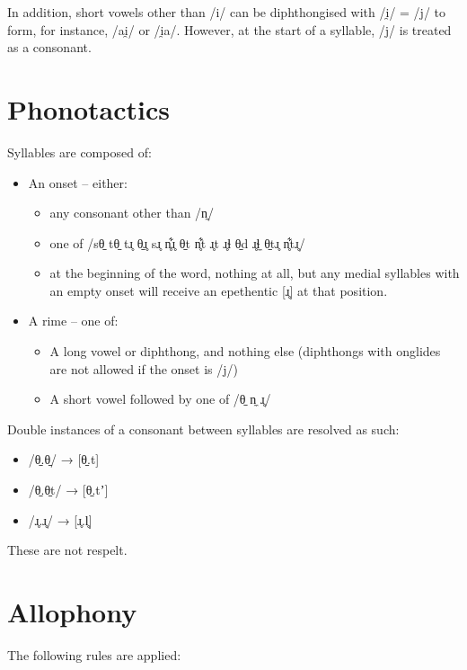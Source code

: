 \documentclass{book}
\begin{document}
In addition, short vowels other than /i/ can be diphthongised with /i̯/ = /j/ to form, for instance,  /ai̯/ or  /i̯a/. However, at the start of a syllable, /j/ is treated as a consonant.

\section{Phonotactics}

Syllables are composed of:

\begin{itemize}
  \item An onset -- either:
  \begin{itemize}
    \item any consonant other than  /n̼/
    \item one of  /sθ̠ tθ̠ tɹ̥ θ̠ɹ̥ sɹ̥ n̥͋ɹ̥ θ̠t n̥͋t ɹ̥t ɹ̥ɬ θ̠d ɹ̥ɬ̼ θ̠tɹ̥ n̥͋tɹ̥/
    \item at the beginning of the word, nothing at all, but any medial syllables with an empty onset will receive an epethentic [ɹ̥] at that position.
  \end{itemize}
  \item A rime – one of:
  \begin{itemize}
    \item A long vowel or diphthong, and nothing else (diphthongs with onglides are not allowed if the onset is  /j/)
    \item A short vowel followed by one of  /θ̠ n̼ ɹ̥/
  \end{itemize}
\end{itemize}

Double instances of a consonant between syllables are resolved as such:

\begin{itemize}
  \item /θ̠.θ̠/ → [θ̠.t]
  \item /θ̠.θ̠t/ → [θ̠.tʼ]
  \item /ɹ̥.ɹ̥/ → [ɹ̥.l̥]
\end{itemize}

These are not respelt.

\section{Allophony}

The following rules are applied:
\end{document}
